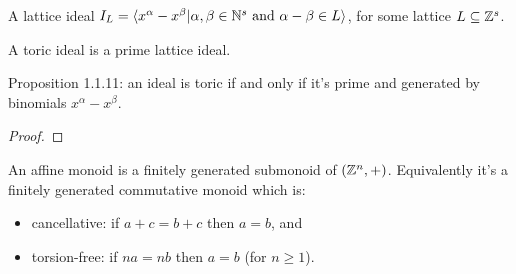 \begin{definition}
  \label{AddMonoidAlgebra.IsToricIdeal}
  \leanok
  A lattice ideal \(I_L = \langle x^\alpha - x^\beta | \alpha, \beta \in {\mathbb N}^s \text{ and } \alpha - \beta \in L \rangle\), for some lattice \(L \subseteq {\mathbb Z}^s\).

  A toric ideal is a prime lattice ideal.
\end{definition}

\begin{proposition}
  \label{AddMonoidAlgebra.isToricIdeal_iff_exists_span_single_sub_single}
  Proposition 1.1.11: an ideal is toric if and only if it's prime and generated by binomials \(x^\alpha - x^\beta\).
\end{proposition}
\begin{proof}
\end{proof}

\begin{definition}
  \label{affSemi}
  An affine monoid is a finitely generated submonoid of \(({\mathbb Z}^n, +)\). Equivalently it's a finitely generated commutative monoid which is:
  \begin{itemize}
    \item cancellative: if \(a + c = b + c\) then \(a = b\), and
    \item torsion-free: if \(n a = n b\) then \(a = b\) (for \(n \geq 1\)).
  \end{itemize}
\end{definition}

